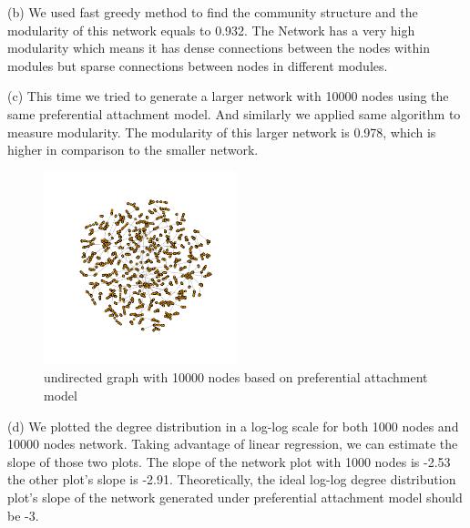 \documentclass[draftcls,12pt,onecolumn]{IEEEtran}
\begin{document}
(b) We used fast greedy method to find the community structure and the modularity of this network equals to 0.932. The Network has a very high modularity which means it has dense connections between the nodes within modules but sparse connections between nodes in different modules.

(c) This time we tried to generate a larger network with 10000 nodes using the same preferential attachment model. And similarly we applied same algorithm to measure modularity. The modularity of this larger network is 0.978, which is higher in comparison to the smaller network.
\begin{figure}[H]
\centering
\includegraphics[width=0.5\textwidth]{1_2_c_network.png}
\caption{undirected graph with 10000 nodes based on preferential attachment model}
\end{figure}

(d) We plotted the degree distribution in a log-log scale for both 1000 nodes and 10000 nodes network. Taking advantage of linear regression, we can estimate the slope of those two plots. The slope of the network plot with 1000 nodes is -2.53 the other plot's slope is -2.91. Theoretically, the ideal log-log degree distribution plot's slope of the network generated under preferential attachment model should be -3.
 
\end{document}
